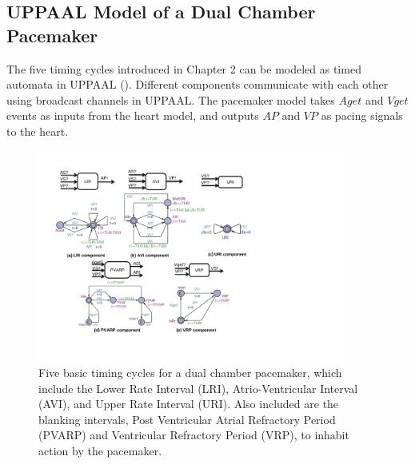 \subsection{UPPAAL Model of a Dual Chamber Pacemaker}
The five timing cycles introduced in Chapter 2 can be modeled as timed automata in UPPAAL ().
Different components communicate with each other using broadcast channels in UPPAAL.
The pacemaker model takes $Aget$ and $Vget$ events as inputs from the heart model, and outputs $AP$ and $VP$ as pacing signals to the heart.
\begin{figure}[!t]
\center
\includegraphics[width=0.9\textwidth]{figs/pacemaker.pdf}
\caption{Five basic timing cycles for a dual chamber pacemaker, which include the Lower Rate Interval (LRI), Atrio-Ventricular Interval (AVI), and Upper Rate Interval (URI). Also included are the blanking intervals, Post Ventricular Atrial Refractory Period (PVARP) and Ventricular Refractory Period (VRP), to inhabit action by the pacemaker.}
\label{fig:PMdesign}
\end{figure} 

